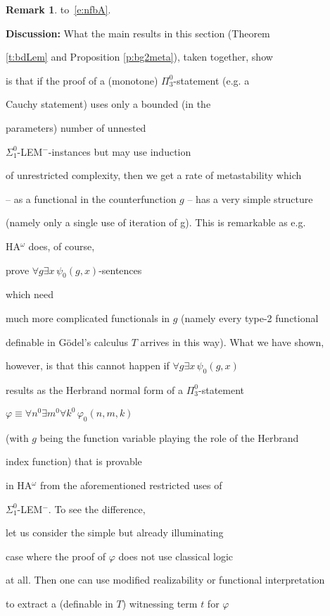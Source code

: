 \documentclass[1p]{elsarticle}
\theoremstyle{plain}
\theoremstyle{definition}
\newtheorem{rmk}[thm]{Remark}
\theoremstyle{remark}
\theoremstyle{definition}
\begin{document}
{\begin{rmk}
to~\eqref{e:nfbA}.

\end{rmk}



{\bf Discussion:} What the main results in this section (Theorem 

\ref{t:bdLem} and Proposition \ref{p:bg2meta}), taken together, show 

is that if the proof of a (monotone) $\Pi^0_3$-statement (e.g. a 

Cauchy statement) uses only a bounded (in the 

parameters) number of unnested 

$\Sigma^0_1$-LEM$^-$-instances but may use induction 

of unrestricted complexity, then we get a rate of metastability which 

-- as a functional in the counterfunction $g$ -- has a very simple structure 

(namely only a single use of iteration of g). This is remarkable as e.g. 

HA$^{\omega}$ does, of course, 

prove $\forall g \exists x\,\psi_0(g,x)$-sentences 

which need 

much more complicated functionals in $g$ (namely every type-2 functional

definable in G\"odel's calculus $T$ arrives in this way). What we have shown, 

however, is that this cannot happen if $\forall g \exists x\,\psi_0(g,x)$

results as the Herbrand normal form of a $\Pi^0_3$-statement 

$\varphi\equiv \forall n^0\exists m^0\forall k^0\,\varphi_0(n,m,k)$ 

(with $g$ being the function variable playing the role of the Herbrand 

index function) that is provable 

in HA$^{\omega}$ from the aforementioned restricted uses of 

$\Sigma^0_1$-LEM$^-.$ To see the difference, 

let us consider the simple but already illuminating 

case where the proof of $\varphi$ does not use classical logic 

at all. Then one can use modified realizability or functional interpretation 

to extract a (definable in $T$) witnessing term $t$ for $\varphi$ 

}
\end{document}
